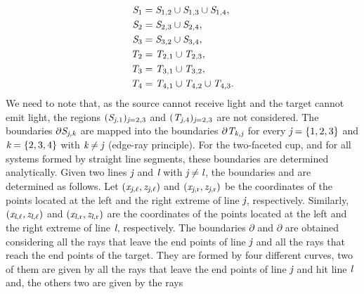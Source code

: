 \begin{equation}
\label{SPS}
\begin{split}
 \mbox{$\emph{S}_{\textit{$1$}}$} & = \mbox{$\emph{S}_{\textit{$1$,$2$}}$}\cup
 \mbox{$\emph{S}_{\textit{$1$,$3$}}$} \cup \mbox{$\emph{S}_{\textit{$1$,$4$}}$},\\
\mbox{$\emph{S}_{\textit{$2$}}$} & =  \mbox{$\emph{S}_{\textit{$2$,$3$}}$} \cup \mbox{$\emph{S}_{\textit{$2$,$4$}}$},\\
\mbox{$\emph{S}_{\textit{$3$}}$} & =  \mbox{$\emph{S}_{\textit{$3$,$2$}}$} \cup \mbox{$\emph{S}_{\textit{$3$,$4$}}$},\\
\mbox{$\emph{T}_{\textit{$2$}}$} & = \mbox{$\emph{T}_{\textit{$2$,$1$}}$} \cup \mbox{$\emph{T}_{\textit{$2$,$3$}}$},\\
\mbox{$\emph{T}_{\textit{$3$}}$} & = \mbox{$\emph{T}_{\textit{$3$,$1$}}$}\cup \mbox{$\emph{T}_{\textit{$3$,$2$}}$},\\
\mbox{$\emph{T}_{\textit{$4$}}$} & = \mbox{$\emph{T}_{\textit{$4$,$1$}}$}\cup \mbox{$\emph{T}_{\textit{$4$,$2$}}$}\cup
\mbox{$\emph{T}_{\textit{$4$,$3$}}$}.
\end{split}
 \end{equation}
We need to note that, as the source cannot receive light and the target cannot emit light,  the regions $(\mbox{$\emph{S}_{\textit{\textit{j},$1$}}$})_{\textit{j}=2,3}$ and $(\mbox{$\emph{T}_{\textit{\textit{j},$4$}}$})_{\textit{j}=2, 3}$ are not considered.
The boundaries $\partial \mbox{$\emph{S}_{\textit{\textit{j},\textit{k}}}$}$ are mapped into the boundaries $\partial \mbox{$\emph{T}_{\textit{\textit{k},\textit{j}}}$}$ for every $\textit{j}=\{1, 2, 3\}$ 
and $\textit{k}=\{2, 3,4\}$ with $\textit{k}\neq \textit{j}$ (edge-ray principle). For the two-faceted cup, and for all systems formed by straight line segments, these boundaries are determined analytically. 
Given two lines $\textit{j}$ and $\textit{l}$
with $\textit{j}\neq \textit{l}$, the boundaries  and  are determined as follows. Let $(\textit{x}_{\textit{j}, \ell}, \textit{z}_{\textit{j}, \ell})$ and $(\textit{x}_{\textit{j}, \textrm{r}},\textit{z}_{\textit{j}, \textrm{r}})$ be the coordinates of the points located at the left and the right extreme of line $\textit{j}$, respectively.
Similarly, $(\textit{x}_{\textit{l}, \ell}, \textit{z}_{\textit{l}, \ell})$ and $(\textit{x}_{\textit{l}, \textrm{r}},\textit{z}_{\textit{l}, \textrm{r}})$ are the coordinates of the points located at the left and the right extreme of line $\textit{l}$, respectively.
The boundaries $\partial$ and $\partial$ are obtained considering all the rays that leave the end points of line $\textit{j}$ 
and all the rays that reach the end points of the target.
They are formed by four different curves,
two of them are given by all the rays that leave the end points of line $\textit{j}$ and hit line $\textit{l}$ and, the others two are given by the rays
